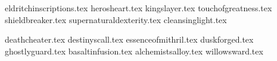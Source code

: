 
\clearpage

\raggedcolumns
\begin{multicols*}{2}


\specialitemsrules{}

\basicsubtitle{\specialitemcategories{}}

\specialitemcategoriesrules{}

\basicsubsubtitle{\weaponenchantments{}}

\weaponenchantmentsrules{}

\basicsubsubtitle{\armourenchantments{}}

\armourenchantmentsrules{}

\basicsubsubtitle{\bannerenchantments{}}

\bannerechantmentsrules{}

\basicsubsubtitle{\artefacts{}}

\artefactsrules{}

\basicsubtitle{\propertiesofspecialitems{}}

\basicsubsubtitle{\dominant{}}

\dominantrules{}

\basicsubsubtitle{\whoisaffected{}}

\whoisaffectedrules{}

\basicsubtitle{\listofcommonspecialitems{}}

\listofcommonspecialitemsrules{}

\hypertarget{weapon_enchantments}{\basicsubsubtitle{\weaponenchantments}}
\label{weapon_enchantments}

\startsortedpricelistNSP

{eldritchinscriptions.tex}
{herosheart.tex}
{kingslayer.tex}
{touchofgreatness.tex}
{shieldbreaker.tex}
{supernaturaldexterity.tex}
{cleansinglight.tex}

\endsortedpricelistNSP

\ifdef{\languageisfrench}{}{\columnbreak}

\hypertarget{armour_enchantments}{\basicsubsubtitle{\armourenchantments}}
\label{armour_enchantments}

\startsortedpricelistNSP

{deathcheater.tex}
{destinyscall.tex}
{essenceofmithril.tex}
{duskforged.tex}
{ghostlyguard.tex}
{basaltinfusion.tex}
{alchemistsalloy.tex}
{willowsward.tex}


\end{multicols*}
